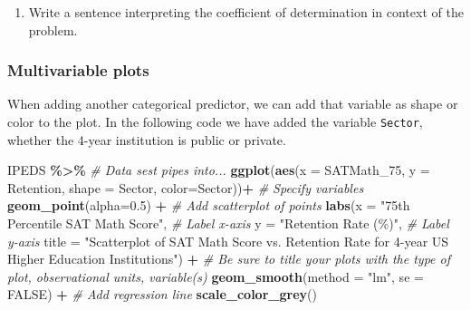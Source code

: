 \documentclass[
]{report}
\newenvironment{Shaded}{\begin{snugshade}}{\end{snugshade}}
\newcommand{\AttributeTok}[1]{\textcolor[rgb]{0.13,0.29,0.53}{#1}}
\newcommand{\CommentTok}[1]{\textcolor[rgb]{0.56,0.35,0.01}{\textit{#1}}}
\newcommand{\ConstantTok}[1]{\textcolor[rgb]{0.56,0.35,0.01}{#1}}
\newcommand{\FloatTok}[1]{\textcolor[rgb]{0.00,0.00,0.81}{#1}}
\newcommand{\FunctionTok}[1]{\textcolor[rgb]{0.13,0.29,0.53}{\textbf{#1}}}
\newcommand{\NormalTok}[1]{#1}
\newcommand{\SpecialCharTok}[1]{\textcolor[rgb]{0.81,0.36,0.00}{\textbf{#1}}}
\newcommand{\StringTok}[1]{\textcolor[rgb]{0.31,0.60,0.02}{#1}}
\providecommand{\tightlist}{%
  \setlength{\itemsep}{0pt}\setlength{\parskip}{0pt}}
\begin{document}
\vspace{0.8in}

\begin{enumerate}
\def\labelenumi{\arabic{enumi}.}
\setcounter{enumi}{8}
\tightlist
\item
  Write a sentence interpreting the coefficient of determination in context of the problem.
\end{enumerate}

\newpage

\subsubsection*{Multivariable plots}\label{multivariable-plots}

When adding another categorical predictor, we can add that variable as shape or color to the plot. In the following code we have added the variable \texttt{Sector}, whether the 4-year institution is public or private.

\begin{Shaded}
\begin{Highlighting}[]
\NormalTok{IPEDS }\SpecialCharTok{\%\textgreater{}\%} \CommentTok{\# Data sest pipes into...}
    \FunctionTok{ggplot}\NormalTok{(}\FunctionTok{aes}\NormalTok{(}\AttributeTok{x =}\NormalTok{ SATMath\_75, }\AttributeTok{y =}\NormalTok{ Retention, }\AttributeTok{shape =}\NormalTok{ Sector, }\AttributeTok{color=}\NormalTok{Sector))}\SpecialCharTok{+}  \CommentTok{\# Specify variables}
    \FunctionTok{geom\_point}\NormalTok{(}\AttributeTok{alpha=}\FloatTok{0.5}\NormalTok{) }\SpecialCharTok{+}  \CommentTok{\# Add scatterplot of points}
    \FunctionTok{labs}\NormalTok{(}\AttributeTok{x =} \StringTok{"75th Percentile SAT Math Score"}\NormalTok{,  }\CommentTok{\# Label x{-}axis}
       \AttributeTok{y =} \StringTok{"Retention Rate (\%)"}\NormalTok{,  }\CommentTok{\# Label y{-}axis}
       \AttributeTok{title =} \StringTok{"Scatterplot of SAT Math Score vs. Retention Rate for }
\StringTok{       4{-}year US Higher Education Institutions"}\NormalTok{) }\SpecialCharTok{+} 
    \CommentTok{\# Be sure to title your plots with the type of plot, observational units, variable(s)}
    \FunctionTok{geom\_smooth}\NormalTok{(}\AttributeTok{method =} \StringTok{"lm"}\NormalTok{, }\AttributeTok{se =} \ConstantTok{FALSE}\NormalTok{) }\SpecialCharTok{+} \CommentTok{\# Add regression line}
    \FunctionTok{scale\_color\_grey}\NormalTok{()}
\end{Highlighting}
\end{Shaded}
\end{document}
